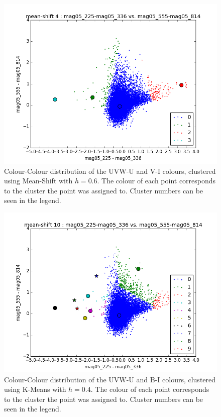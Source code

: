 \begin{figure}[H]
\centering
\includegraphics[width=\linewidth]{figs/meanshift_color_4cl_mag05_225-mag05_336vsmag05_555-mag05_814}
\caption{Colour-Colour distribution of the UVW-U and V-I colours, clustered using Mean-Shift with $h=0.6$. The colour of each point corresponds to the cluster the point was assigned to. Cluster numbers can be seen in the legend.}
\label{fig:UVWMS1}
\end{figure}

\begin{figure}[H]
\centering
\includegraphics[width=\linewidth]{figs/meanshift_color_10cl_mag05_225-mag05_336vsmag05_555-mag05_814}
\caption{Colour-Colour distribution of the UVW-U and B-I colours, clustered using K-Means with $h=0.4$. The colour of each point corresponds to the cluster the point was assigned to. Cluster numbers can be seen in the legend.}
\label{fig:UVWMS2}
\end{figure}

